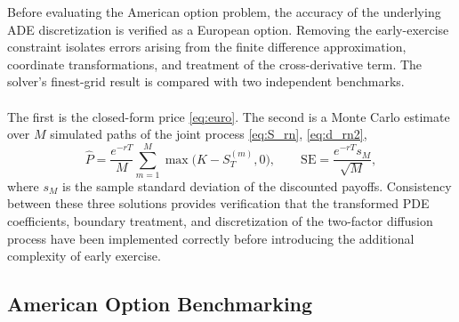 \documentclass[12pt,a4paper]{article}
\begin{document}
Before evaluating the American option problem, the accuracy of the underlying ADE discretization is verified as a European option. Removing the early-exercise constraint isolates errors arising from the finite difference approximation, coordinate transformations, and treatment of the cross-derivative term. The solver's finest-grid result is compared with two independent benchmarks.\\\\
The first is the closed-form price \eqref{eq:euro}. The second is a Monte Carlo estimate over $M$ simulated paths of the joint process \eqref{eq:S_rn}, \eqref{eq:d_rn2},
\begin{equation}
\hat P=\frac{e^{-rT}}{M}\sum_{m=1}^{M}\max\big(K-S_T^{(m)},0\big),\qquad \mathrm{SE}=\frac{e^{-rT}s_M}{\sqrt M},
\end{equation}
where $s_M$ is the sample standard deviation of the discounted payoffs. Consistency between these three solutions provides verification that the transformed PDE coefficients, boundary treatment, and discretization of the two-factor diffusion process have been implemented correctly before introducing the additional complexity of early exercise.

\subsection{American Option Benchmarking}
\end{document}
